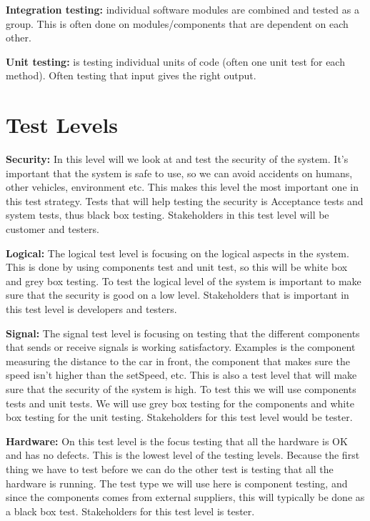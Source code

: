 		{\bf Integration testing:} individual software modules are combined and tested as a group. 
		This is often done on modules/components that are dependent on each other.
		
		{\bf Unit testing:} is testing individual units of code (often one unit test for each method).
		Often testing that input gives the right output.
	
	\clearpage
	\section{Test Levels}
				
		{\bf Security:} In this level will we look at and test the security of the system. 
		It’s important that the system is safe to use, so we can avoid accidents on humans, 
		other vehicles, environment etc. This makes this level the most important one in this 
		test strategy. Tests that will help testing the security is Acceptance tests and system 
		tests, thus black box testing. Stakeholders in this test level will be customer and 
		testers.

		{\bf Logical:} The logical test level is focusing on the logical aspects in the system. 
		This is done by using components test and unit test, so this will be white box and grey 
		box testing. To test the logical level of the system is important to make sure that the 
		security is good on a low level. Stakeholders that is important in this test level is 
		developers and testers.

		{\bf Signal:} The signal test level is focusing on testing that the different components 
		that sends or receive signals is working satisfactory. Examples is the component measuring 
		the distance to the car in front,  the component that makes sure the speed isn’t higher 
		than the setSpeed, etc. This is also a test level that will make sure that the security of 
		the system is high. To test this we will use components tests and unit tests. We will use 
		grey box testing for the components and white box testing for the unit testing. Stakeholders 
		for this test level would be tester.
		
		{\bf Hardware:} On this test level is the focus testing that all the hardware is OK 
 		and has no defects. This is the lowest level of the testing levels. Because the first 
 		thing we have to test before we can do the other test is testing that all the hardware 				
 		is running. The test type we will use here is component testing, and since the components 
 		comes from external suppliers, this will typically be done as a black box test. 
 		Stakeholders for this test level is tester. 
 					
